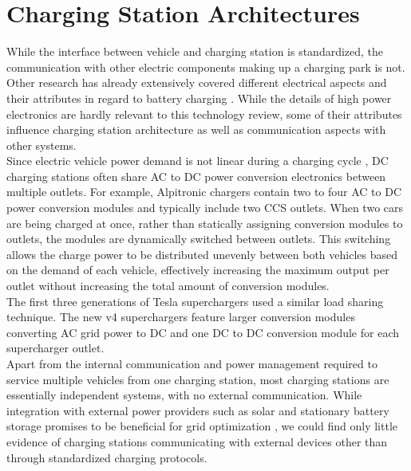 \documentclass[conference,flushend]{iaria} %
\begin{document}
\section{Charging Station Architectures} \label{sec:chargingstationarchitecture}
While the interface between vehicle and charging station is standardized, the communication with other electric components making up a charging park is not.
Other research has already extensively covered different electrical aspects and their attributes in regard to battery charging \cite{tu_extreme_2019, das_electric_2020, deb_review_2021}.
While the details of high power electronics are hardly relevant to this technology review, some of their attributes influence charging station architecture as well as communication aspects with other systems. \\
Since electric vehicle power demand is not linear during a charging cycle \cite{noauthor_audi_nodate}, DC charging stations often share AC to DC power conversion electronics between multiple outlets.
For example, Alpitronic chargers contain two to four AC to DC power conversion modules and typically include two CCS outlets.
When two cars are being charged at once, rather than statically assigning conversion modules to outlets, the modules are dynamically switched between outlets.
This switching allows the charge power to be distributed unevenly between both vehicles based on the demand of each vehicle, effectively increasing the maximum output per outlet without increasing the total amount of conversion modules. \\
The first three generations of Tesla superchargers used a similar load sharing technique.
The new v4 superchargers feature larger conversion modules converting AC grid power to DC and one DC to DC conversion module for each supercharger outlet. \\
Apart from the internal communication and power management required to service multiple vehicles from one charging station, most charging stations are essentially independent systems, with no external communication.
While integration with external power providers such as solar and stationary battery storage promises to be beneficial for grid optimization \cite{deb_review_2021}, we could find only little evidence of charging stations communicating with external devices other than through standardized charging protocols.

\iffalse
\end{document}
